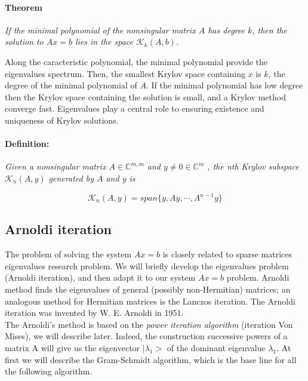 \paragraph{Theorem}{\it If the minimal polynomial of the nonsingular matrix $A$ has degree $k$, then the solution to $Ax = b$ lies in the space $\mathcal{K}_{k}(A, b)$.}

Along the caracteristic polynomial, the minimal polynomial provide the eigenvalues spectrum. Then, the smallest Krylov space containing $x$ is $k$, the degree of the minimal polynomial of $A$. If the minimal polynomial has low degree then the Krylov space containing the solution is small, and a Krylov method converge fast. Eigenvalues play a central role to ensuring existence and uniqueness of Krylov solutions. \\

\paragraph{Definition:}{\it Given a nonsingular matrix $A \in \mathbb{C}^{m,m}$ and $y \ne 0 \in \mathbb{C}^{m}$ , the nth Krylov subspace $\mathcal{K}_{n}(A,y)$ generated by $A$ and $y$ is

$$
\mathcal{K}_{n}(A,y) = span\{y, Ay, \cdots , A^{n-1}y\}
$$
}

\subsection{Arnoldi iteration}

The problem of solving the system $Ax = b$ is closely related to sparse matrices eigenvalues research problem. We will briefly develop the eigenvalues problem (Arnoldi iteration), and then adapt it to our system $Ax = b$ problem. Arnoldi method finds the eigenvalues of general (possibly non-Hermitian) matrices; an analogous method for Hermitian matrices is the Lanczos iteration. The Arnoldi iteration was invented by W. E. Arnoldi in 1951.\\
The Arnoldi's method is based on the {\it power iteration algorithm} (iteration Von Mises), we will describe later. Indeed, the construction successive powers of a matrix A will give us the eigenvector $| \lambda_{1} >$ of the dominant eigenvalue $\lambda_{1}$. At first we will describe the Gram-Schmidt algorithm, which is the base line for all the following algorithm.

